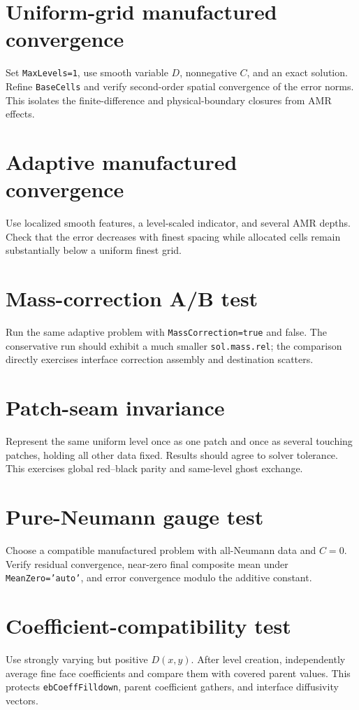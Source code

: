 \documentclass[11pt,oneside,openany]{book}
\newcommand{\code}[1]{\textnormal{\texttt{#1}}}
\begin{document}
\section{Uniform-grid manufactured convergence}
Set \code{MaxLevels=1}, use smooth variable $D$, nonnegative $C$, and an exact solution. Refine \code{BaseCells} and verify second-order spatial convergence of the error norms. This isolates the finite-difference and physical-boundary closures from AMR effects.

\section{Adaptive manufactured convergence}
Use localized smooth features, a level-scaled indicator, and several AMR depths. Check that the error decreases with finest spacing while allocated cells remain substantially below a uniform finest grid.

\section{Mass-correction A/B test}
Run the same adaptive problem with \code{MassCorrection=true} and false. The conservative run should exhibit a much smaller \code{sol.mass.rel}; the comparison directly exercises interface correction assembly and destination scatters.

\section{Patch-seam invariance}
Represent the same uniform level once as one patch and once as several touching patches, holding all other data fixed. Results should agree to solver tolerance. This exercises global red--black parity and same-level ghost exchange.

\section{Pure-Neumann gauge test}
Choose a compatible manufactured problem with all-Neumann data and $C=0$. Verify residual convergence, near-zero final composite mean under \code{MeanZero='auto'}, and error convergence modulo the additive constant.

\section{Coefficient-compatibility test}
Use strongly varying but positive $D(x,y)$. After level creation, independently average fine face coefficients and compare them with covered parent values. This protects \code{ebCoeffFilldown}, parent coefficient gathers, and interface diffusivity vectors.
\end{document}
